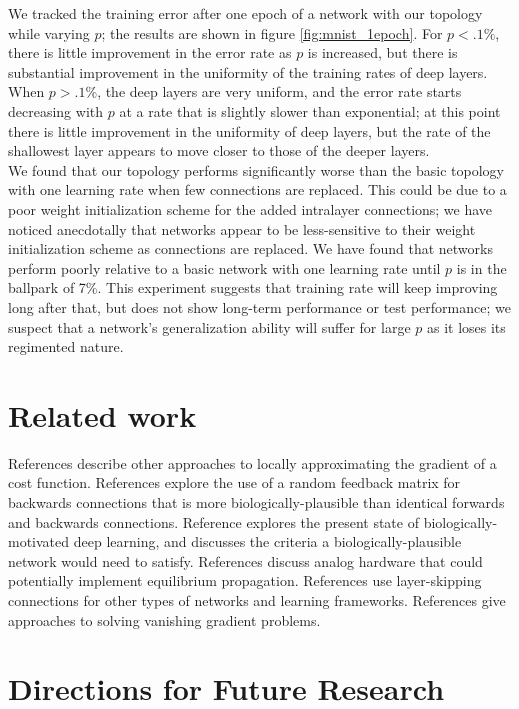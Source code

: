 \documentclass[utf8]{frontiersSCNS}
\newcommand{\npar}{\\\indent}
\begin{document}
We tracked the training error after one epoch of a network with our topology while varying $p$; the results are shown in figure \ref{fig:mnist_1epoch}. For $p<.1\%$, there is little improvement in the error rate as $p$ is increased, but there is substantial improvement in the uniformity of the training rates of deep layers. When $p>.1\%$, the deep layers are very uniform, and the error rate starts decreasing with $p$ at a rate that is slightly slower than exponential; at this point there is little improvement in the uniformity of deep layers, but the rate of the shallowest layer appears to move closer to those of the deeper layers.
\npar
We found that our topology performs significantly worse than the basic topology with one learning rate when few connections are replaced. This could be due to a poor weight initialization scheme for the added intralayer connections; we have noticed anecdotally that networks appear to be less-sensitive to their weight initialization scheme as connections are replaced. We have found that networks perform poorly relative to a basic network with one learning rate until $p$ is in the ballpark of 7\%. This experiment suggests that training rate will keep improving long after that, but does not show long-term performance or test performance; we suspect that a network's generalization ability will suffer for large $p$ as it loses its regimented nature.

\section{Related work}
References \cite{lee2015, xie2003, pineda1987} describe other approaches to locally approximating the gradient of a cost function. References \cite{lillicrap2014, @crafton2019} explore the use of a random feedback matrix for backwards connections that is more biologically-plausible than identical forwards and backwards connections. Reference \cite{bartunov2018} explores the present state of biologically-motivated deep learning, and \cite{bengio2015} discusses the criteria a biologically-plausible network would need to satisfy. References \cite{shainline2019, davies2018, nahmias2013} discuss analog hardware that could potentially implement equilibrium propagation. References \cite{he2015, srivastava2015, xiaohu2011, krishnan2019} use layer-skipping connections for other types of networks and learning frameworks. References \cite{ioffe2015, glorot2010} give approaches to solving vanishing gradient problems.

\section{Directions for Future Research}
\end{document}
